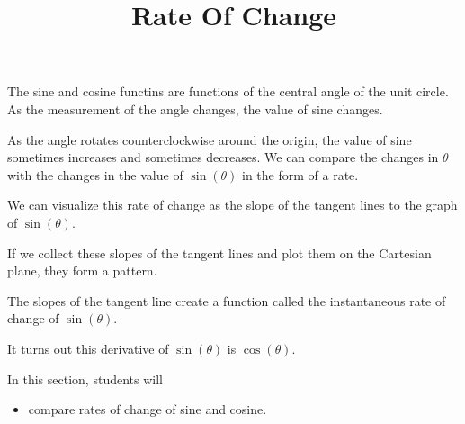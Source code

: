 \documentclass{ximera}
\title{Rate Of Change}
\begin{document}
\begin{abstract}
%
\end{abstract}
\maketitle




The sine and cosine functins are functions of the central angle of the unit circle.  As the measurement of the angle changes, the value of sine changes.  


As the angle rotates counterclockwise around the origin, the value of sine sometimes increases and sometimes decreases.  We can compare the changes in $\theta$ with the changes in the value of $\sin(\theta)$ in the form of a rate. 

We can visualize this rate of change as the slope of the tangent lines to the graph of $\sin(\theta)$.

If we collect these slopes of the tangent lines and plot them on the Cartesian plane, they form a pattern.


The slopes of the tangent line create a function called the instantaneous rate of change of $\sin(\theta)$.

It turns out this derivative of $\sin(\theta)$ is $\cos(\theta)$.



\begin{sectionOutcomes}
In this section, students will 

\begin{itemize}
\item compare rates of change of sine and cosine.
\end{itemize}
\end{sectionOutcomes}
\end{document}
